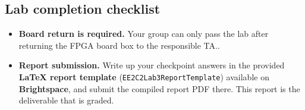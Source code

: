 \documentclass[11pt]{article}
\renewcommand{\_}{\textunderscore\allowbreak}
\begin{document}
\subsection*{Lab completion checklist}
\begin{notebox}
    \begin{itemize}
        \item \textbf{Board return is required.} Your group can only pass the lab after returning the FPGA board box to the responsible TA..
        \item \textbf{Report submission.} Write up your checkpoint answers in the provided \textbf{\LaTeX{} report
template} (\texttt{EE2C2\_Lab3\_Report\_Template}) available on \textbf{Brightspace}, and submit the
compiled report PDF there. This report is the deliverable that is graded.
    \end{itemize}
\end{notebox}
\end{document}

